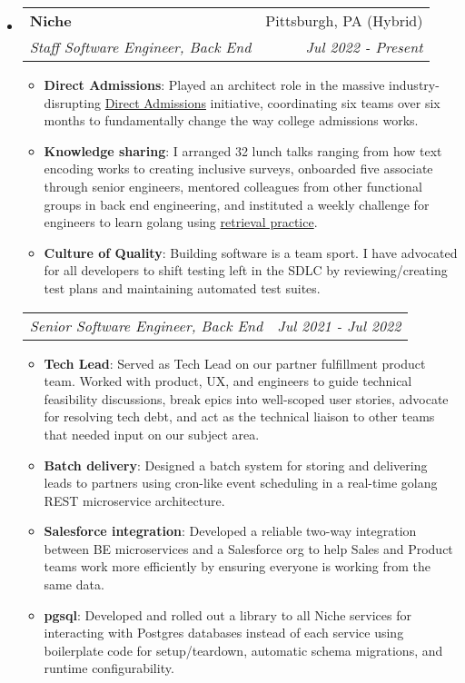 \documentclass[letterpaper,11pt]{article}
\makeatletter
\newenvironment{resumeHeadingList}{\begin{itemize}[leftmargin=*]}{\end{itemize}}
\newenvironment{resumeItemList}{\begin{itemize}}{\end{itemize}\vspace{-5pt}}
\newcommand{\resumeItem}[2]{
  \item\small{
    \textbf{#1}{: #2 \vspace{-2pt}}
  }
}
\newcommand{\resumeHeading}[4]{
  \vspace{-1pt}\item
    \begin{tabular*}{0.97\textwidth}[t]{l@{\extracolsep{\fill}}r}
      \textbf{#1} & #2 \\
      \textit{\small#3} & \textit{\small #4} \\
    \end{tabular*}\vspace{-5pt}
}
\newcommand{\resumeSubheading}[2]{
    \begin{tabular*}{0.97\textwidth}{l@{\extracolsep{\fill}}r}
      \textit{\small#1} & \textit{\small #2} \\
    \end{tabular*}\vspace{-5pt}
}
\newcommand{\icon}[4]{
  \raisebox{-#4\height}{\href{#2}{\texttt{[image: \#1]}}}
}
\makeatother
\begin{document}
  \begin{resumeHeadingList}

    \resumeHeading
      {\icon{img/niche.png}{https://niche.com}{4ex}{0.25}Niche}{Pittsburgh, PA (Hybrid)}
      {Staff Software Engineer, Back End}{Jul 2022 - Present}
      \begin{resumeItemList}
        \resumeItem{Direct Admissions}{Played an architect role in the massive industry-disrupting \href{https://www.niche.com/about/direct-admissions/}{Direct Admissions} initiative, coordinating six teams over six months to fundamentally change the way college admissions works.}
        \resumeItem{Knowledge sharing}{I arranged 32 lunch talks ranging from how text encoding works to creating inclusive surveys, onboarded five associate through senior engineers, mentored colleagues from other functional groups in back end engineering, and instituted a weekly challenge for engineers to learn golang using \href{https://psychology.ucsd.edu/undergraduate-program/undergraduate-resources/academic-writing-resources/effective-studying/retrieval-practice.html}{retrieval practice}.}
        \resumeItem{Culture of Quality}{Building software is a team sport. I have advocated for all developers to shift testing left in the SDLC by reviewing/creating test plans and maintaining automated test suites.}
      \end{resumeItemList}
      \resumeSubheading
        {Senior Software Engineer, Back End}{Jul 2021 - Jul 2022}
        \begin{resumeItemList}
          \resumeItem{Tech Lead}{Served as Tech Lead on our partner fulfillment product team. Worked with product, UX, and engineers to guide technical feasibility discussions, break epics into well-scoped user stories, advocate for resolving tech debt, and act as the technical liaison to other teams that needed input on our subject area.}
          \resumeItem{Batch delivery}{Designed a batch system for storing and delivering leads to partners using cron-like event scheduling in a real-time golang REST microservice architecture.}
          \resumeItem{Salesforce integration}{Developed a reliable two-way integration between BE microservices and a Salesforce org to help Sales and Product teams work more efficiently by ensuring everyone is working from the same data.}
          \resumeItem{pgsql}{Developed and rolled out a library to all Niche services for interacting with Postgres databases instead of each service using boilerplate code for setup/teardown, automatic schema migrations, and runtime configurability.}

\end{resumeItemList}
\end{resumeHeadingList}
\end{document}
